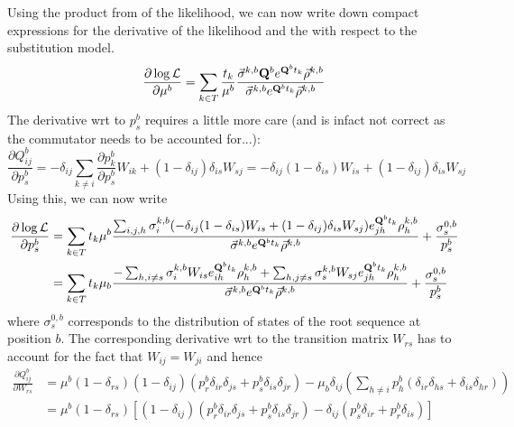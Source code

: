 \documentclass[aps,rmp, onecolumn]{revtex4}
\newcommand{\mat}[1]{{\bf #1}}
\newcommand{\eqp}{p}
\newcommand{\LH}{\mathcal{L}}
\begin{document}
Using the product from of the likelihood, we can now write down compact expressions for the derivative of the likelihood and the with respect to the substitution model.
\begin{equation}
	\frac{\partial \log \LH}{\partial \mu^{b}} = \sum_{k\in T} \frac{t_k}{\mu^{b}}\frac{\vec{\sigma}^{k,b} \mat{Q}^{b} e^{\mat{Q}^{b}t_k} \vec{\rho}^{k,b}}{\vec{\sigma}^{k,b} e^{\mat{Q}^{b}t_k} \vec{\rho}^{k,b}}
\end{equation}
The derivative wrt to $\eqp^{b}_{s}$ requires a little more care (and is infact not correct as the commutator needs to be accounted for...):
\begin{equation}
	\frac{\partial Q^b_{ij}}{\partial \eqp^b_s} = -\delta_{ij}\sum_{k\neq i} \frac{\partial \eqp^b_k}{\partial \eqp^b_s} W_{ik} + (1-\delta_{ij})\delta_{is}W_{sj} = -\delta_{ij}(1-\delta_{is}) W_{is} + (1-\delta_{ij})\delta_{is}W_{sj}
\end{equation}
Using this, we can now write
\begin{equation}
\begin{split}
 \frac{\partial \log \LH}{\partial \eqp^{b}_s} &= \sum_{k\in T} t_k\mu^b \frac{\sum_{i,j,h}\sigma^{k,b}_i (-\delta_{ij}(1-\delta_{is}) W_{is} + (1-\delta_{ij})\delta_{is}W_{sj})e^{\mat{Q}^{b}t_k}_{jh} \rho^{k,b}_h}{\vec{\sigma}^{k,b} e^{\mat{Q}^{b}t_k} \vec{\rho}^{k,b}} + \frac{\sigma^{0,b}_s}{\eqp^b_s} \\
& =\sum_{k\in T} t_k\mu_b \frac{-\sum_{h,i\neq s}\sigma^{k,b}_i W_{is}e^{\mat{Q}^{b}t_k}_{ih} \rho^{k,b}_h + \sum_{h,j\neq s}\sigma^{k,b}_s W_{sj} e^{\mat{Q}^{b}t_k}_{jh} \rho^{k,b}_h}{\vec{\sigma}^{k,b} e^{\mat{Q}^{b}t_k} \vec{\rho}^{k,b}} + \frac{\sigma^{0,b}_s}{\eqp^b_s}
\end{split}
\end{equation}
where $\sigma^{0,b}_s$ corresponds to the distribution of states of the root sequence at position $b$.
The corresponding derivative wrt to the transition matrix $W_{rs}$ has to account for the fact that $W_{ij}=W_{ji}$ and hence
\begin{equation}
\begin{split}
\frac{\partial Q^b_{ij}}{\partial W_{rs}} & = \mu^b(1-\delta_{rs})(1-\delta_{ij})(p^b_r\delta_{ir}\delta_{js} + p^b_s\delta_{is}\delta_{jr}) - \mu_b\delta_{ij}(\sum_{h\neq i} p^b_h (\delta_{ir}\delta_{hs} + \delta_{is}\delta_{hr}) ) \\
& = \mu^b(1-\delta_{rs})\left[(1-\delta_{ij})(p^b_r\delta_{ir}\delta_{js} + p^b_s\delta_{is}\delta_{jr}) - \delta_{ij}(p^b_s \delta_{ir} + p^b_r\delta_{is})\right]
\end{split}
\end{equation}
\end{document}
